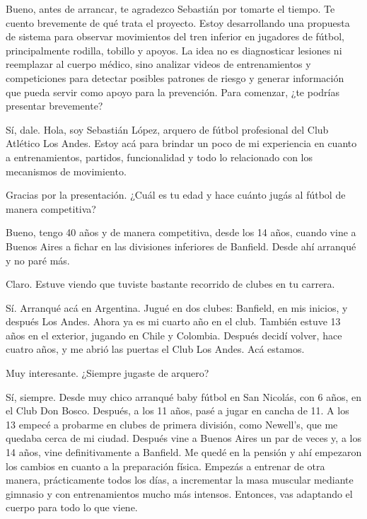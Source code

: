 \begin{description}[leftmargin=0pt, itemindent=\parindent, labelsep=0.5em, itemsep=0pt, parsep=0pt, topsep=0pt]
    \item[\textbf{Entrevistador:}] Bueno, antes de arrancar, te agradezco Sebastián por tomarte el tiempo. Te cuento brevemente de qué trata el proyecto. Estoy desarrollando una propuesta de sistema para observar movimientos del tren inferior en jugadores de fútbol, principalmente rodilla, tobillo y apoyos. La idea no es diagnosticar lesiones ni reemplazar al cuerpo médico, sino analizar videos de entrenamientos y competiciones para detectar posibles patrones de riesgo y generar información que pueda servir como apoyo para la prevención. Para comenzar, ¿te podrías presentar brevemente?

    \item[\textbf{Sebastián López:}] Sí, dale. Hola, soy Sebastián López, arquero de fútbol profesional del Club Atlético Los Andes. Estoy acá para brindar un poco de mi experiencia en cuanto a entrenamientos, partidos, funcionalidad y todo lo relacionado con los mecanismos de movimiento.

    \item[\textbf{Entrevistador:}] Gracias por la presentación. ¿Cuál es tu edad y hace cuánto jugás al fútbol de manera competitiva?

    \item[\textbf{Sebastián López:}] Bueno, tengo 40 años y de manera competitiva, desde los 14 años, cuando vine a Buenos Aires a fichar en las divisiones inferiores de Banfield. Desde ahí arranqué y no paré más.

    \item[\textbf{Entrevistador:}] Claro. Estuve viendo que tuviste bastante recorrido de clubes en tu carrera.

    \item[\textbf{Sebastián López:}] Sí. Arranqué acá en Argentina. Jugué en dos clubes: Banfield, en mis inicios, y después Los Andes. Ahora ya es mi cuarto año en el club. También estuve 13 años en el exterior, jugando en Chile y Colombia. Después decidí volver, hace cuatro años, y me abrió las puertas el Club Los Andes. Acá estamos.

    \item[\textbf{Entrevistador:}] Muy interesante. ¿Siempre jugaste de arquero?

    \item[\textbf{Sebastián López:}] Sí, siempre. Desde muy chico arranqué baby fútbol en San Nicolás, con 6 años, en el Club Don Bosco. Después, a los 11 años, pasé a jugar en cancha de 11. A los 13 empecé a probarme en clubes de primera división, como Newell's, que me quedaba cerca de mi ciudad. Después vine a Buenos Aires un par de veces y, a los 14 años, vine definitivamente a Banfield. Me quedé en la pensión y ahí empezaron los cambios en cuanto a la preparación física. Empezás a entrenar de otra manera, prácticamente todos los días, a incrementar la masa muscular mediante gimnasio y con entrenamientos mucho más intensos. Entonces, vas adaptando el cuerpo para todo lo que viene.


\end{description}

